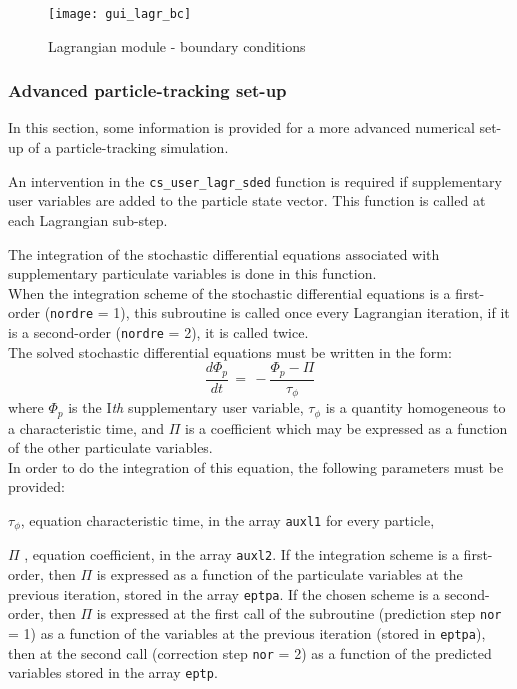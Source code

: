 {{{\begin{figure}[ht]
\begin{center}
\texttt{[image: gui\_lagr\_bc]}
\caption{Lagrangian module - boundary conditions}
\label{fig:CL-Lag}
\end{center}
\end{figure}

\subsubsection{Advanced particle-tracking set-up}

In this section, some information is provided for a more advanced numerical set-up of a particle-tracking simulation.


\noindent
An intervention in the \texttt{cs\_user\_lagr\_sded} function is required if
supplementary user variables are added to the particle state vector.
This function is called at each Lagrangian sub-step.

\noindent
The integration of the stochastic differential equations associated with
supplementary particulate variables is done in this function. \\
When the integration scheme of the stochastic differential equations is
a first-order (\texttt{nordre} = 1), this subroutine is called once every
Lagrangian iteration, if it is a second-order (\texttt{nordre} = 2), it is called
twice. \\

\noindent
The solved stochastic differential equations must be written in the
form:
\begin{displaymath}
\frac{d \Phi_p}{dt} \,=\, - \frac{\Phi_p - \Pi}{\tau_\phi}
\end{displaymath}
where $\Phi_p$ is the I\textit{th} supplementary user variable,
$\tau_\phi$ is a quantity homogeneous to a characteristic time, and $\Pi$ is
a coefficient which may be expressed as a function of the other
particulate variables. \\
In order to do the integration of this equation, the following
parameters must be provided:
\begin{list}{-}{}
\item $\tau_\phi$, equation characteristic time, in the array \texttt{auxl1} for
      every particle,
\item $\Pi$ , equation coefficient, in the array \texttt{auxl2}. If the
      integration scheme is a first-order, then $\Pi$ is expressed as a
      function of the particulate variables at the previous iteration,
      stored in the array \texttt{eptpa}. If the chosen scheme is a second-order,
      then $\Pi$ is expressed at the first call of the subroutine
      (prediction step \texttt{nor} = 1) as a function of the variables at the
      previous iteration (stored in \texttt{eptpa}), then at the second call
      (correction step \texttt{nor} = 2) as a function of the predicted variables
      stored in the array \texttt{eptp}.
\end{list}

}}}
